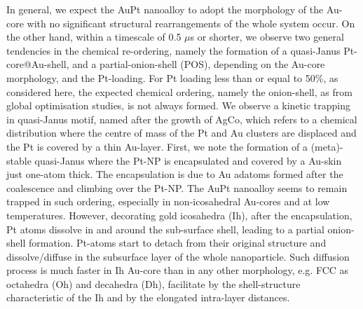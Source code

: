 In general, we expect the AuPt nanoalloy to adopt the morphology of the Au-core with no significant structural rearrangements of the whole system occur. On the other hand, within a  timescale of 0.5 $\mu$s or shorter, we observe two general tendencies in the chemical re-ordering, namely the formation of a quasi-Janus Pt-core@Au-shell, and a partial-onion-shell (POS), depending on the Au-core morphology, and the Pt-loading. For Pt loading less than or equal to 50\%, as considered here, the expected chemical ordering, namely the onion-shell, as from global optimisation studies, \cite{Deng2010} is not always formed. We observe a kinetic trapping in  quasi-Janus motif, named after the growth of AgCo\cite{Parsina2010}, which refers to a chemical distribution where the centre of mass of the Pt and Au clusters are displaced and the Pt is covered by a thin Au-layer. 
%
First, we note the formation of a (meta)-stable quasi-Janus where the Pt-NP is encapsulated and covered by a Au-skin just one-atom thick. The encapsulation is due to Au adatoms formed after the coalescence and climbing over the Pt-NP. The AuPt nanoalloy seems to remain trapped in such ordering, especially in non-icosahedral Au-cores and at low temperatures. 
However, decorating gold icosahedra (Ih), after the encapsulation, Pt atoms dissolve in and around the sub-surface shell, leading to a partial onion-shell  formation. Pt-atoms start to detach from their original structure and dissolve/diffuse in the subsurface layer of the whole nanoparticle. Such diffusion process is much faster in Ih Au-core than in any other morphology, e.g. FCC as octahedra (Oh) and decahedra (Dh), facilitate by the shell-structure characteristic of the Ih and by the elongated intra-layer distances.

